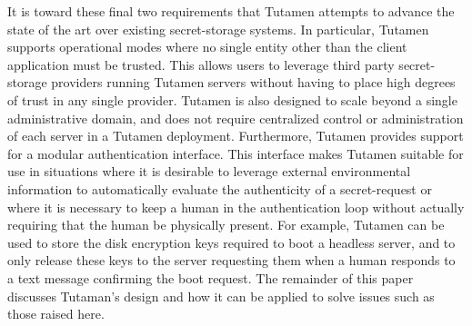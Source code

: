 It is toward these final two requirements that Tutamen attempts to
advance the state of the art over existing secret-storage systems. In
particular, Tutamen supports operational modes where no single entity
other than the client application must be trusted. This allows users
to leverage third party secret-storage providers running Tutamen
servers without having to place high degrees of trust in any single
provider. Tutamen is also designed to scale beyond a single
administrative domain, and does not require centralized control or
administration of each server in a Tutamen deployment. Furthermore,
Tutamen provides support for a modular authentication interface. This
interface makes Tutamen suitable for use in situations where it is
desirable to leverage external environmental information to
automatically evaluate the authenticity of a secret-request or where
it is necessary to keep a human in the authentication loop without
actually requiring that the human be physically present. For example,
Tutamen can be used to store the disk encryption keys required to boot
a headless server, and to only release these keys to the server
requesting them when a human responds to a text message confirming the
boot request.  The remainder of this paper discusses Tutaman's design
and how it can be applied to solve issues such as those raised here.

